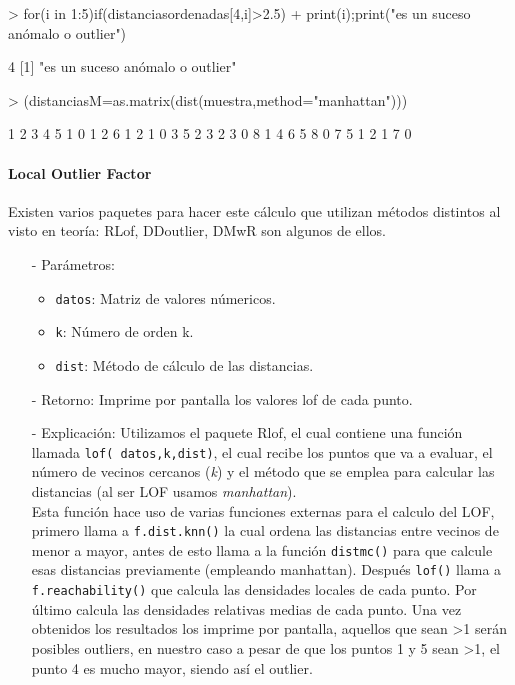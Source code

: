 \documentclass[a4paper, 12pt]{article}
\begin{document}
\begin{Schunk}
\begin{Sinput}
> for(i in 1:5){if(distanciasordenadas[4,i]>2.5)
+ {print(i);print("es un suceso anómalo o outlier")}}
\end{Sinput}
\begin{Soutput}
[1] 4
[1] "es un suceso anómalo o outlier"
\end{Soutput}
\begin{Sinput}
> (distanciasM=as.matrix(dist(muestra,method="manhattan")))
\end{Sinput}
\begin{Soutput}
  1 2 3 4 5
1 0 1 2 6 1
2 1 0 3 5 2
3 2 3 0 8 1
4 6 5 8 0 7
5 1 2 1 7 0
\end{Soutput}
\end{Schunk}
	
	\paragraph{Local Outlier Factor}
	Existen varios paquetes para hacer este cálculo que utilizan métodos distintos al visto en teoría: RLof, DDoutlier, DMwR son algunos de ellos.
	\begin{itemize}
		\item[-] Parámetros:
		\begin{itemize}
			\item \texttt{datos}: Matriz de valores númericos.
			\item \texttt{k}: Número de orden k.
			\item \texttt{dist}: Método de cálculo de las distancias.
		\end{itemize}

		\item[-] Retorno: Imprime por pantalla los valores lof de cada punto.
		
		\item[-] Explicación: Utilizamos el paquete Rlof, el cual contiene una función llamada \texttt{lof( datos,k,dist)}, el cual recibe los puntos que va a evaluar, el número de vecinos cercanos (\emph{k}) y el método que se emplea para calcular las distancias (al ser LOF usamos \emph{manhattan}). \\
		Esta función hace uso de varias funciones externas para el calculo del LOF, primero llama a \texttt{f.dist.knn()} la cual ordena las distancias entre vecinos de menor a mayor, antes de esto llama a la función \texttt{distmc()} para que calcule esas distancias previamente (empleando manhattan). Después \texttt{lof()} llama a \texttt{f.reachability()} que calcula las densidades locales de cada punto. Por último calcula las densidades relativas medias de cada punto. Una vez obtenidos los resultados los imprime por pantalla, aquellos que sean >1 serán posibles outliers, en nuestro caso a pesar de que los puntos 1 y 5 sean >1, el punto 4 es mucho mayor, siendo así el outlier.\\ 
	\end{itemize}
\end{document}
